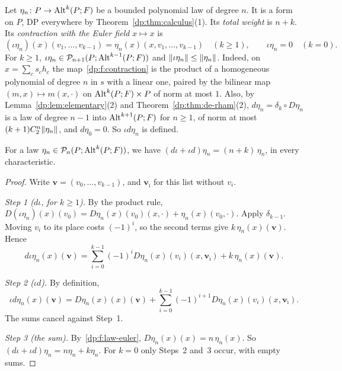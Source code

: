 Let $\eta_n\colon P\to\operatorname{Alt}^k(P;F)$ be a bounded polynomial law of degree $n$. It is a form on $P$, DP everywhere by Theorem~\ref{dp:thm:calculus}(1). Its \emph{total weight} is $n+k$. Its \emph{contraction with the Euler field} $x\mapsto x$ is
\begin{equation}\label{dp:f:contraction}
 (\iota\eta_n)(x)(v_1,\dots,v_{k-1})=\eta_n(x)(x,v_1,\dots,v_{k-1})\quad(k\ge1),\qquad\iota\eta_n=0\quad(k=0).
\end{equation}
For $k\ge1$, $\iota\eta_n\in\mathcal P_{n+1}(P;\operatorname{Alt}^{k-1}(P;F))$ and $\lVert \iota\eta_n\rVert\le\lVert \eta_n\rVert$. Indeed, on $x=\sum_cs_ch_c$ the map~\eqref{dp:f:contraction} is the product of a homogeneous polynomial of degree $n$ in $s$ with a linear one, paired by the bilinear map $(m,x)\mapsto m(x,\cdot)$ on $\operatorname{Alt}^k(P;F)\times P$ of norm at most $1$. Also, by Lemma~\ref{dp:lem:elementary}(2) and Theorem~\ref{dp:thm:de-rham}(2), $d\eta_n=\delta_k\circ D\eta_n$ is a law of degree $n-1$ into $\operatorname{Alt}^{k+1}(P;F)$ for $n\ge1$, of norm at most $(k+1)C_2^n\lVert \eta_n\rVert$, and $d\eta_0=0$. So $\iota d\eta_n$ is defined.

\begin{proposition}\label{dp:prop:euler}
For a law $\eta_n\in\mathcal P_n(P;\operatorname{Alt}^k(P;F))$, we have $(d\iota+\iota d)\eta_n=(n+k)\,\eta_n$, in every characteristic.
\end{proposition}

\begin{proof}
Write $\mathbf v=(v_0,\dots,v_{k-1})$, and $\mathbf v_{\hat\imath}$ for this list without $v_i$.

\emph{Step 1 ($d\iota$, for $k\ge1$).} By the product rule, $D(\iota\eta_n)(x)(v_0)=D\eta_n(x)(v_0)(x,\cdot)+\eta_n(x)(v_0,\cdot)$. Apply $\delta_{k-1}$. Moving $v_i$ to its place costs $(-1)^i$, so the second terms give $k\,\eta_n(x)(\mathbf v)$. Hence
\[
 d\iota\eta_n(x)(\mathbf v)=\sum_{i=0}^{k-1}(-1)^iD\eta_n(x)(v_i)(x,\mathbf v_{\hat\imath})+k\,\eta_n(x)(\mathbf v).
\]

\emph{Step 2 ($\iota d$).} By definition,
\[
 \iota d\eta_n(x)(\mathbf v)=D\eta_n(x)(x)(\mathbf v)+\sum_{i=0}^{k-1}(-1)^{i+1}D\eta_n(x)(v_i)(x,\mathbf v_{\hat\imath}).
\]
The sums cancel against Step~1.

\emph{Step 3 (the sum).} By~\eqref{dp:f:law-euler}, $D\eta_n(x)(x)=n\,\eta_n(x)$. So $(d\iota+\iota d)\eta_n=n\eta_n+k\eta_n$. For $k=0$ only Steps~2 and~3 occur, with empty sums.
\end{proof}

